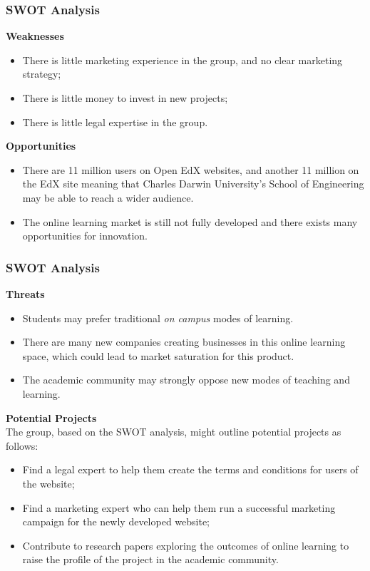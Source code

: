 \documentclass{beamer}
\begin{document}
\begin{frame}
\frametitle{SWOT Analysis}
\textbf{Weaknesses}
\begin{itemize}
\item There is little marketing experience in the group, and no clear marketing strategy;
\item There is little money to invest in new projects;
\item There is little legal expertise in the group.
\end{itemize}
\vspace{0.5cm}
\textbf{Opportunities}
\begin{itemize}
\item There are 11 million users on Open EdX websites, and another 11 million on the EdX site meaning that Charles Darwin University's School of Engineering may be able to reach a wider audience.
\item The online learning market is still not fully developed and there exists many opportunities for innovation.
\end{itemize}
\end{frame}
\begin{frame}
\frametitle{SWOT Analysis}
\textbf{Threats}
\begin{itemize}
\item Students may prefer traditional \textit{on campus} modes of learning.
\item There are many new companies creating businesses in this online learning space, which could lead to market saturation for this product.
\item The academic community may strongly oppose new modes of teaching and learning.
\end{itemize}
\vspace{0.25cm}
\textbf{Potential Projects}\\
The group, based on the SWOT analysis, might outline potential projects as follows:
\begin{itemize}
\item Find a legal expert to help them create the terms and conditions for users of the website;
\item Find a marketing expert who can help them run a successful marketing campaign for the newly developed website;
\item Contribute to research papers exploring the outcomes of online learning to raise the profile of the project in the academic community.
\end{itemize}
\end{frame}
\end{document}
